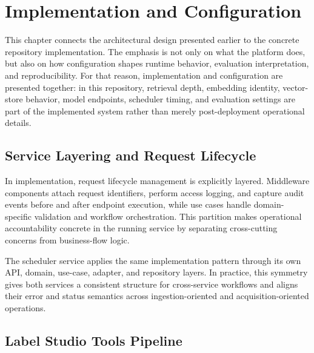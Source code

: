 \chapter{Implementation and Configuration}

This chapter connects the architectural design presented earlier to the concrete repository implementation. The emphasis is not only on what the platform does, but also on how configuration shapes runtime behavior, evaluation interpretation, and reproducibility. For that reason, implementation and configuration are presented together: in this repository, retrieval depth, embedding identity, vector-store behavior, model endpoints, scheduler timing, and evaluation settings are part of the implemented system rather than merely post-deployment operational details.

\section{Service Layering and Request Lifecycle}

In implementation, request lifecycle management is explicitly layered. Middleware components attach request identifiers, perform access logging, and capture audit events before and after endpoint execution, while use cases handle domain-specific validation and workflow orchestration. This partition makes operational accountability concrete in the running service by separating cross-cutting concerns from business-flow logic.

The scheduler service applies the same implementation pattern through its own API, domain, use-case, adapter, and repository layers. In practice, this symmetry gives both services a consistent structure for cross-service workflows and aligns their error and status semantics across ingestion-oriented and acquisition-oriented operations.

\section{Label Studio Tools Pipeline}

